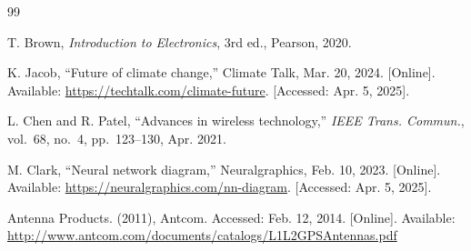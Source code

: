 \documentclass[conference]{IEEEtran}
\begin{document}
%
%
%
\balance
\begin{thebibliography}{99}

T. Brown, \textit{Introduction to Electronics}, 3rd ed., Pearson, 2020.

K. Jacob, ``Future of climate change,'' Climate Talk, Mar. 20, 2024.
[Online]. Available: \url{https://techtalk.com/climate-future}.
[Accessed: Apr. 5, 2025].

L. Chen and R. Patel, ``Advances in wireless technology,''
\textit{IEEE Trans. Commun.}, vol.~68, no.~4, pp.~123--130, Apr. 2021.

M. Clark, ``Neural network diagram,'' Neuralgraphics, Feb. 10, 2023.
[Online]. Available: \url{https://neuralgraphics.com/nn-diagram}.
[Accessed: Apr. 5, 2025].

Antenna Products. (2011), Antcom. Accessed: Feb. 12, 2014. [Online].
Available: \url{http://www.antcom.com/documents/catalogs/L1L2GPSAntennas.pdf}

\end{thebibliography}

\end{document}
